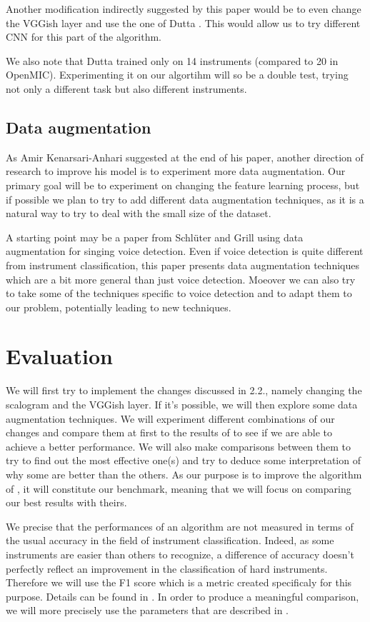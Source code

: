\documentclass[final]{cvpr}
\begin{document}
Another modification indirectly suggested by this paper would be to even change the VGGish layer and use the one of Dutta \etal. This would allow us to try different CNN for this part of the algorithm.

We also note that Dutta \etal trained only on 14 instruments (compared to 20 in OpenMIC). Experimenting it on our algortihm will so be a double test, trying not only a different task but also different instruments.
\subsection{Data augmentation}
As Amir Kenarsari-Anhari suggested at the end of his paper, another direction of research to improve his model is to experiment more data augmentation. Our primary goal will be to experiment on changing the feature learning process, but if possible we plan to try to add different data augmentation techniques, as it is a natural way to try to deal with the small size of the dataset. 

A starting point may be a paper from Schlüter and Grill \cite{data_aug} using data augmentation for singing voice detection. Even if voice detection is quite different from instrument classification, this paper presents data augmentation techniques which are a bit more general than just voice detection. Moeover we can also try to take some of the techniques specific to voice detection and to adapt them to our problem, potentially leading to new techniques.
\section{Evaluation}
We will first try to implement the changes discussed in 2.2., namely changing the scalogram and the VGGish layer. If it's possible, we will then explore some data augmentation techniques. We will experiment different combinations of our changes and compare them at first to the results of \cite{squelette_progr} to see if we are able to achieve a better performance. We will also make comparisons between them to try to find out the most effective one(s) and try to deduce some interpretation of why some are better than the others. As our purpose is to improve the algorithm of \cite{squelette_progr}, it will constitute our benchmark, meaning that we will focus on comparing our best results with theirs. 

We precise that the performances of an algorithm are not measured in terms of the usual accuracy in the field of instrument classification. Indeed, as some instruments are easier than others to recognize, a difference of accuracy doesn't perfectly reflect an improvement in the classification of hard instruments. Therefore we will use the F1 score which is a metric created specificaly for this purpose. Details can be found in \cite{metric}. In order to produce a meaningful comparison, we will more precisely use the parameters that are described in \cite{squelette_progr}.
{\small
	
	
}
\end{document}
